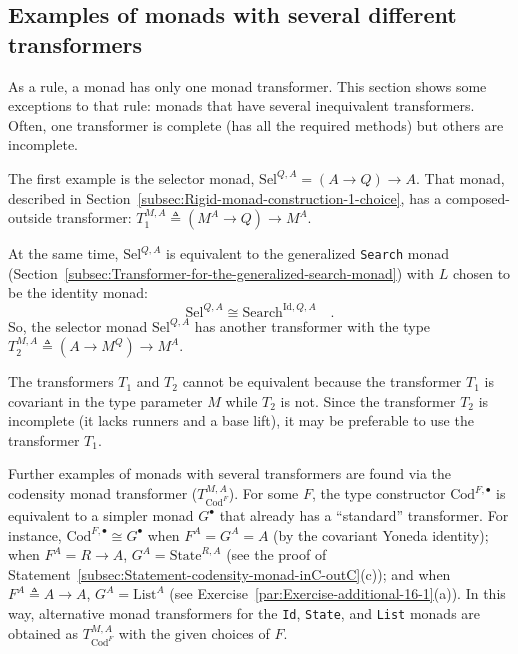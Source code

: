 \subsection{Examples of monads with several different transformers\label{subsec:Examples-of-monads-with-two-different-transformers}}

As a rule, a monad has only one monad transformer. This section shows
some exceptions to that rule: monads that have several inequivalent
transformers. Often, one transformer is complete (has all the required
methods) but others are incomplete.

The first example is the selector monad,
$\text{Sel}^{Q,A}=(A\rightarrow Q)\rightarrow A$. That monad, described
in Section~\ref{subsec:Rigid-monad-construction-1-choice}, has a
composed-outside transformer: $T_{1}^{M,A}\triangleq(M^{A}\rightarrow Q)\rightarrow M^{A}$. 

At the same time, $\text{Sel}^{Q,A}$ is equivalent to the generalized
\lstinline!Search! monad (Section~\ref{subsec:Transformer-for-the-generalized-search-monad})
with $L$ chosen to be the identity monad:
\[
\text{Sel}^{Q,A}\cong\text{Search}^{\text{Id},Q,A}\quad.
\]
So, the selector monad $\text{Sel}^{Q,A}$ has another transformer
with the type $T_{2}^{M,A}\triangleq(A\rightarrow M^{Q})\rightarrow M^{A}$. 

The transformers $T_{1}$ and $T_{2}$ cannot be equivalent because
the transformer $T_{1}$ is covariant in the type parameter $M$ while
$T_{2}$ is not. Since the transformer $T_{2}$ is incomplete (it
lacks runners and a base lift), it may be preferable to use the transformer
$T_{1}$.

Further examples of monads with several transformers are found via
the codensity monad transformer ($T_{\text{Cod}^{F}}^{M,A}$). For
some $F$, the type constructor $\text{Cod}^{F,\bullet}$ is equivalent
to a simpler monad $G^{\bullet}$ that already has a \textsf{``}standard\textsf{''}
transformer. For instance, $\text{Cod}^{F,\bullet}\cong G^{\bullet}$
when $F^{A}=G^{A}=A$ (by the covariant Yoneda identity); when $F^{A}=R\rightarrow A$,
$G^{A}=\text{State}^{R,A}$ (see the proof of Statement~\ref{subsec:Statement-codensity-monad-inC-outC}(c));
and when $F^{A}\triangleq A\rightarrow A$, $G^{A}=\text{List}^{A}$
(see Exercise~\ref{par:Exercise-additional-16-1}(a)). In this way,
alternative monad transformers for the \lstinline!Id!, \lstinline!State!,
and \lstinline!List! monads are obtained as $T_{\text{Cod}^{F}}^{M,A}$
with the given choices of $F$. 

